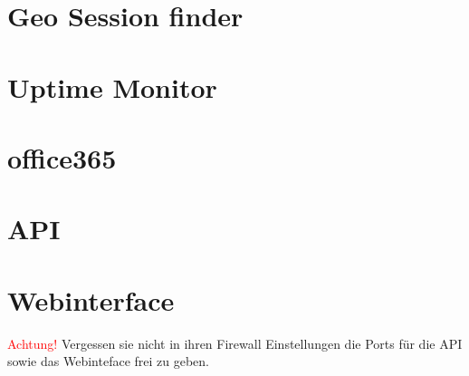 \documentclass{article}
\begin{document}
	\section{Geo Session finder}
	
	\newpage
	
	\section{Uptime Monitor}
	
	\newpage
	
	\section{office365}
	
	\newpage
	
	\section{API}
	
	\newpage
	
	\section{Webinterface}
	
	\newpage
	\textcolor{red}{Achtung!} Vergessen sie nicht in ihren Firewall Einstellungen die Ports für die API sowie das Webinteface frei zu geben.
\end{document}
